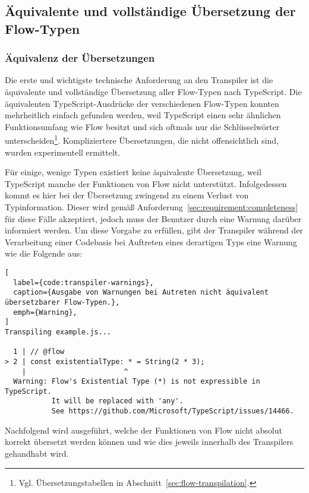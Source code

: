 \subsection{Äquivalente und vollständige Übersetzung der Flow-Typen}
\label{sec:interpretation:equivalent-translation}

\subsubsection{Äquivalenz der Übersetzungen}

Die erste und wichtigste technische Anforderung an den Transpiler ist die äquivalente und vollständige Übersetzung aller Flow-Typen nach TypeScript. Die äquivalenten TypeScript-Ausdrücke der verschiedenen Flow-Typen konnten mehrheitlich einfach gefunden werden, weil TypeScript einen sehr ähnlichen Funktionsumfang wie Flow besitzt und sich oftmals nur die Schlüsselwörter unterscheiden\footnote{Vgl. Übersetzungstabellen in Abschnitt~\ref{sec:flow-transpilation}.}. Kompliziertere Übersetzungen, die nicht offensichtlich sind, wurden experimentell ermittelt.

Für einige, wenige Typen existiert keine äquivalente Übersetzung, weil TypeScript manche der Funktionen von Flow nicht unterstützt. Infolgedessen kommt es hier bei der Übersetzung zwingend zu einem Verlust von Typinformation. Dieser wird gemäß Anforderung~\ref{sec:requirement:completeness} für diese Fälle akzeptiert, jedoch muss der Benutzer durch eine Warnung darüber informiert werden. Um diese Vorgabe zu erfüllen, gibt der Transpiler während der Verarbeitung einer Codebasis bei Auftreten eines derartigen Typs eine Warnung wie die Folgende aus:

\begin{lstlisting}[
  label={code:transpiler-warnings},
  caption={Ausgabe von Warnungen bei Autreten nicht äquivalent übersetzbarer Flow-Typen.},
  emph={Warning},
]
Transpiling example.js...

  1 | // @flow
> 2 | const existentialType: * = String(2 * 3);
    |                       ^
  Warning: Flow's Existential Type (*) is not expressible in TypeScript.
           It will be replaced with 'any'.
           See https://github.com/Microsoft/TypeScript/issues/14466.
\end{lstlisting}

Nachfolgend wird ausgeführt, welche der Funktionen von Flow nicht absolut korrekt übersetzt werden können und wie dies jeweils innerhalb des Transpilers gehandhabt wird.

